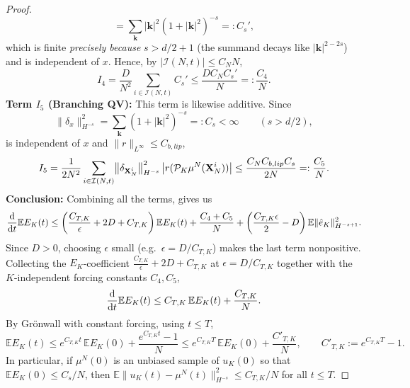 \documentclass[a4paper,fleqn]{cas-sc}
\theoremstyle{definition}
\theoremstyle{remark}
\begin{document}
\begin{proof}
\[=\sum_{\mathbf k}|\mathbf k|^2(1+|\mathbf k|^2)^{-s}=:C_s',
\]
which is finite \emph{precisely because} $s>d/2+1$ (the summand decays like
$|\mathbf k|^{2-2s}$) and is independent of $x$. Hence, by $|\mathcal I(N,t)|\le C_NN$,
\begin{equation}
    I_4 = \frac{D}{N^2}\sum_{i\in \mathcal I (N,t)}C_s'
    \le \frac{D C_N C_s'}{N}=:\frac{C_4}{N}.
\end{equation}
\textbf{Term $I_5$ (Branching QV):}
This term is likewise additive. Since
\[
\|\delta_x\|_{H^{-s}}^2=\sum_{\mathbf k}(1+|\mathbf k|^2)^{-s}=:C_s<\infty
\qquad(s>d/2),
\]
is independent of $x$ and $\|r\|_{L^\infty}\le C_{b,lip}$,
\[
    I_5 = \frac{1}{2N^2}\sum_{i\in \mathcal I (N,t)}
    \bigl\|\delta_{\mathbf{X}_N^i}\bigr\|_{H^{-s}}^2\,\bigl|r(\mathcal P_K\mu^N(\mathbf{X}_N^i))\bigr|
    \le \frac{C_N C_{b,lip} C_s}{2N}=:\frac{C_5}{N}.
\]
\textbf{Conclusion:}
Combining all the terms, gives us
\[
\frac{\mathrm{d}}{\mathrm{d} t}\mathbb{E}E_{K}(t) \le \left( \frac{C_{T,K}}{\epsilon} + 2D + C_{T,K} \right) \mathbb{E}E_K(t) + \frac{C_4+C_5}{N} + \left( \frac{C_{T,K} \epsilon}{2} - D \right) \mathbb{E}\|\hat{e}_{K}\|_{H^{-s+1}}^{2}.
\]
Since $D > 0$, choosing $\epsilon$ small (e.g.\ $\epsilon = D/C_{T,K}$) makes the last
term nonpositive. Collecting the $E_K$-coefficient $\tfrac{C_{T,K}}{\epsilon}+2D+C_{T,K}$ at
$\epsilon=D/C_{T,K}$ together with the $K$-independent forcing constants $C_4,C_5$,
\[
    \frac{\mathrm{d}}{\mathrm{d} t} \mathbb E  E_K(t) \leq C_{T,K}\, \mathbb E  E_K(t) + \frac{C_{T,K}}{N}. 
\]
By Gr\"onwall with constant forcing, using $t\le T$,
\[
\mathbb E E_K(t) \leq e^{C_{T,K}t}\,\mathbb E E_K(0) + \frac{e^{C_{T,K}t}-1}{N}
\le e^{C_{T,K}T}\,\mathbb E E_K(0) + \frac{C'_{T,K}}{N},
\qquad C'_{T,K}:=e^{C_{T,K}T}-1.
\]
In particular, if $\mu^N(0)$ is an unbiased sample of $u_K(0)$ so that
$\mathbb E E_K(0)\le C_s/N$, then
$\mathbb E\|u_K(t)-\mu^N(t)\|_{H^{-s}}^2\le C_{T,K}/N$ for all $t\le T$.
\end{proof}
\end{document}
